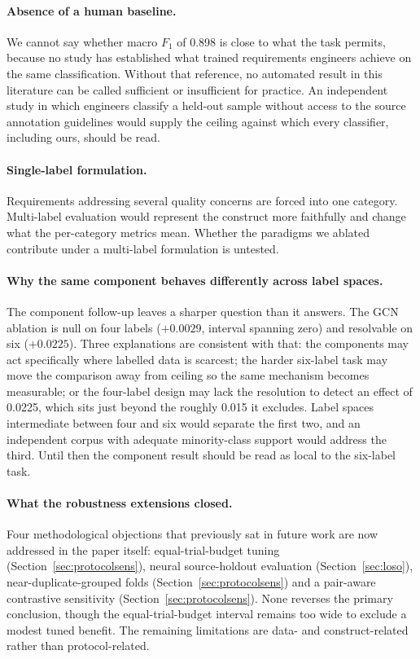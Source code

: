 \documentclass[11pt,a4paper]{article}
\begin{document}
\paragraph{Absence of a human baseline.}
We cannot say whether macro $F_1$ of 0.898 is close to what the task permits, because no
study has established what trained requirements engineers achieve on the same
classification. Without that reference, no automated result in this literature can be
called sufficient or insufficient for practice. An independent study in which engineers
classify a held-out sample without access to the source annotation guidelines would supply
the ceiling against which every classifier, including ours, should be read.

\paragraph{Single-label formulation.}
Requirements addressing several quality concerns are forced into one category. Multi-label
evaluation would represent the construct more faithfully and change what the per-category
metrics mean. Whether the paradigms we ablated contribute under a multi-label formulation
is untested.

\paragraph{Why the same component behaves differently across label spaces.}
The component follow-up leaves a sharper question than it answers. The GCN ablation is null on four labels
($+0.0029$, interval spanning zero) and resolvable on six ($+0.0225$). Three explanations are consistent
with that: the components may act specifically where labelled data is scarcest; the harder six-label task
may move the comparison away from ceiling so the same mechanism becomes measurable; or the four-label
design may lack the resolution to detect an effect of 0.0225, which sits just beyond the roughly 0.015 it
excludes. Label spaces intermediate between four and six would separate the first two, and an independent
corpus with adequate minority-class support would address the third. Until then the component result
should be read as local to the six-label task.

\paragraph{What the robustness extensions closed.}
Four methodological objections that previously sat in future work are now addressed in the paper itself:
equal-trial-budget tuning (Section~\ref{sec:protocolsens}), neural source-holdout evaluation
(Section~\ref{sec:loso}), near-duplicate-grouped folds (Section~\ref{sec:protocolsens}) and a pair-aware
contrastive sensitivity (Section~\ref{sec:protocolsens}). None reverses the primary conclusion, though the
equal-trial-budget interval remains too wide to exclude a modest tuned benefit. The remaining limitations are
data- and construct-related rather than protocol-related.
\end{document}

